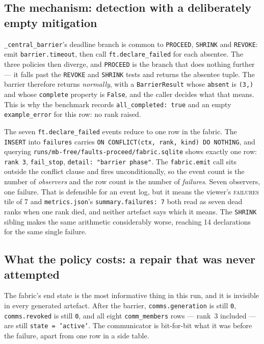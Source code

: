 \documentclass[11pt]{article}
\begin{document}
\subsection{The mechanism: detection with a deliberately empty mitigation}

\texttt{\_central\_barrier}'s deadline branch is common to \texttt{PROCEED},
\texttt{SHRINK} and \texttt{REVOKE}: emit \texttt{barrier.timeout}, then call
\texttt{ft.declare\_failed} for each absentee. The three policies then diverge, and
\texttt{PROCEED} is the branch that does nothing further --- it falls past the
\texttt{REVOKE} and \texttt{SHRINK} tests and returns the absentee tuple. The barrier
therefore returns \emph{normally}, with a \texttt{BarrierResult} whose \texttt{absent} is
\texttt{(3,)} and whose \texttt{complete} property is \texttt{False}, and the caller
decides what that means. This is why the benchmark records \texttt{all\_completed: true}
and an empty \texttt{example\_error} for this row: no rank raised.

The seven \texttt{ft.declare\_failed} events reduce to one row in the fabric. The
\texttt{INSERT} into \texttt{failures} carries
\texttt{ON CONFLICT(ctx, rank, kind) DO NOTHING}, and querying
\texttt{runs/mb-free/faults-proceed/fabric.sqlite} shows exactly one row: \texttt{rank 3},
\texttt{fail\_stop}, \texttt{detail: "barrier phase"}. The \texttt{fabric.emit} call sits
outside the conflict clause and fires unconditionally, so the event count is the number of
\emph{observers} and the row count is the number of \emph{failures}. Seven observers, one
failure. That is defensible for an event log, but it means the viewer's
\textsc{failures} tile of 7 and \texttt{metrics.json}'s \texttt{summary.failures: 7} both
read as seven dead ranks when one rank died, and neither artefact says which it means.
The \texttt{SHRINK} sibling makes the same arithmetic considerably worse, reaching 14
declarations for the same single failure.

\subsection{What the policy costs: a repair that was never attempted}

The fabric's end state is the most informative thing in this run, and it is invisible in
every generated artefact. After the barrier, \texttt{comms.generation} is still
\texttt{0}, \texttt{comms.revoked} is still \texttt{0}, and all eight \texttt{comm\_members}
rows --- rank~3 included --- are still \texttt{state = 'active'}. The communicator is
bit-for-bit what it was before the failure, apart from one row in a side table.
\end{document}
